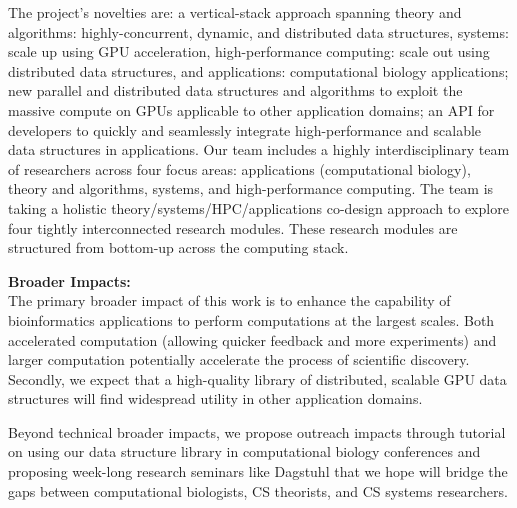 The project’s novelties are: a vertical-stack approach spanning theory and algorithms: highly-concurrent, dynamic, and distributed data structures, systems: scale up using GPU acceleration, high-performance computing: scale out using distributed data structures, and applications: computational biology applications; new parallel and distributed data structures and algorithms to exploit the massive compute on GPUs applicable to other application domains; an API for developers to quickly and seamlessly integrate high-performance and scalable data structures in applications.
%
Our team includes a highly interdisciplinary team of researchers across four focus areas: applications (computational biology), theory and algorithms, systems, and high-performance computing. The team is taking a holistic theory/systems/HPC/applications co-design approach to explore four tightly interconnected research modules. These research modules are structured from bottom-up across the computing stack.

\noindent \textbf{\large Broader Impacts: }\\
The primary broader impact of this work is to enhance the capability of bioinformatics applications to perform computations at the largest scales. Both accelerated computation (allowing quicker feedback and more experiments) and larger computation potentially accelerate the process of scientific discovery. Secondly, we expect that a high-quality library of distributed, scalable GPU data structures will find widespread utility in other application domains.

Beyond technical broader impacts, we propose outreach impacts through tutorial on using our data structure library in computational biology conferences and proposing week-long research seminars like Dagstuhl that we hope will bridge the gaps between computational biologists, CS theorists, and CS systems researchers.
